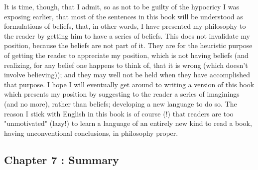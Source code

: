 \documentclass[10pt,twoside,draft]{memoir}
\begin{document}
{It is time, though, that I admit, so as not to be guilty of the hypocricy I 
was exposing earlier, that most of the sentences in this book will be 
understood as formulations of beliefs, that, in other words, I have presented 
my philosophy to the reader by getting him to have a series of beliefs. This 
does not invalidate my position, because the beliefs are not part of it. They 
are for the heuristic purpose of getting the reader to appreciate my position, 
which is not having beliefs (and realizing, for any belief one happens to think 
of, that it is wrong (which doesn't involve believing)); and they may well not 
be held when they have accomplished that purpose. I hope I will eventually 
get around to writing a version of this book which presents my position by 
suggesting to the reader a series of imaginings (and no more), rather than 
beliefs; developing a new language to do so. The reason I stick with English 
in this book is of course (!) that readers are too "unmotivated" (lazy!) to 
learn a language of an entirely new kind to read a book, having 
unconventional conclusions, in philosophy proper. 

\subsection*{Chapter 7 : Summary}

}
\end{document}
